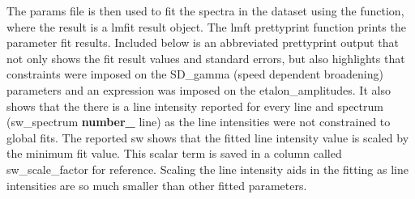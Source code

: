 \documentclass[letterpaper,10pt,english]{sphinxmanual}
\begin{document}
\begin{sphinxVerbatim}[commandchars=\\\{\}]
  



   
                
                     \PYG{p}{[}\PYG{p}{]}     
                
                        
                             \PYG{p}{[}\PYG{p}{]}
\end{sphinxVerbatim}

\sphinxAtStartPar
The params file is then used to fit the spectra in the dataset using the {\hyperref[\detokenize{MATS:MATS.fit_dataset.Fit_DataSet.fit_data}]{}} function, where the result is a lmfit result object. The lmft prettyprint function prints the parameter fit results.  Included below is an abbreviated prettyprint output that not only shows the fit result values and standard errors, but also highlights that constraints were imposed on the SD\_gamma (speed dependent broadening) parameters and an expression was imposed on the etalon\_amplitudes.  It also shows that the there is a line intensity reported for every line and spectrum (sw\_spectrum {\color{red}\bfseries{}number\_} line) as the line intensities were not constrained to global fits.  The reported sw shows that the fitted line intensity value is scaled by the minimum fit value.  This scalar term is saved in a column called sw\_scale\_factor for reference.  Scaling the line intensity aids in the fitting as line intensities are so much smaller than other fitted parameters.

\begin{sphinxVerbatim}[commandchars=\\\{\}]
     
 
\end{sphinxVerbatim}
\end{document}
